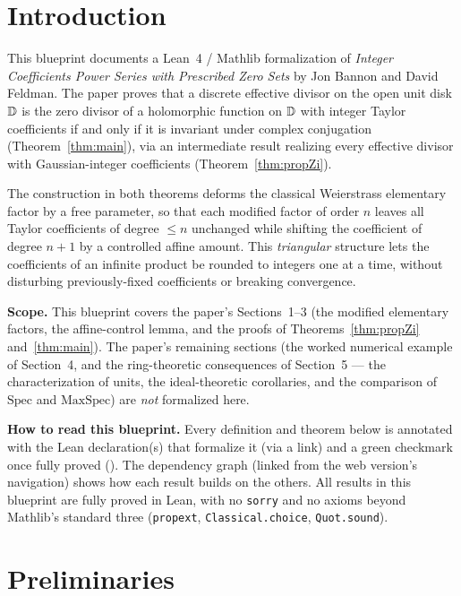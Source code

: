 \chapter{Introduction}

This blueprint documents a Lean~4 / Mathlib formalization of
\emph{Integer Coefficients Power Series with Prescribed Zero Sets} by
Jon Bannon and David Feldman. The paper proves that a discrete effective
divisor on the open unit disk $\mathbb{D}$ is the zero divisor of a holomorphic
function on $\mathbb{D}$ with integer Taylor coefficients if and only if it is
invariant under complex conjugation (Theorem~\ref{thm:main}), via an
intermediate result realizing every effective divisor with Gaussian-integer
coefficients (Theorem~\ref{thm:propZi}).

The construction in both theorems deforms the classical Weierstrass
elementary factor by a free parameter, so that each modified factor of
order $n$ leaves all Taylor coefficients of degree $\le n$ unchanged while
shifting the coefficient of degree $n+1$ by a controlled affine amount.
This \emph{triangular} structure lets the coefficients of an infinite
product be rounded to integers one at a time, without disturbing
previously-fixed coefficients or breaking convergence.

\bigskip
\noindent\textbf{Scope.} This blueprint covers the paper's
Sections~1--3 (the modified elementary factors, the affine-control lemma,
and the proofs of Theorems~\ref{thm:propZi} and~\ref{thm:main}). The
paper's remaining sections (the worked numerical example of
Section~4, and the ring-theoretic consequences of Section~5 — the
characterization of units, the ideal-theoretic corollaries, and the
comparison of $\mathrm{Spec}$ and $\mathrm{MaxSpec}$) are \emph{not}
formalized here.

\bigskip
\noindent\textbf{How to read this blueprint.} Every definition and
theorem below is annotated with the Lean declaration(s) that formalize it
(via a \lean{} link) and a green checkmark once fully proved
(\leanok). The dependency graph (linked from the web version's
navigation) shows how each result builds on the others. All results in
this blueprint are fully proved in Lean, with no \texttt{sorry} and no
axioms beyond Mathlib's standard three (\texttt{propext},
\texttt{Classical.choice}, \texttt{Quot.sound}).

\chapter{Preliminaries}

